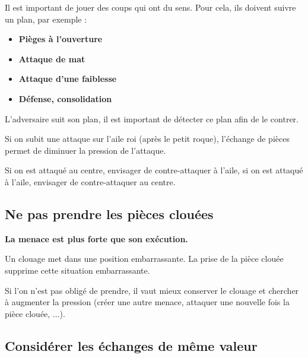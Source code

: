 Il est important de jouer des coups qui ont du sens. Pour cela, ils doivent suivre un plan, par exemple : 

\begin{itemize}[leftmargin=2.7cm, label=, itemsep=0pt]%
\item  {\bf Pièges à l'ouverture}
\item  {\bf Attaque de mat}
\item  {\bf Attaque d'une faiblesse}
\item  {\bf Défense, consolidation}
\end{itemize}

L'adversaire suit son plan, il est important de détecter ce plan afin de le contrer.

{\footnotesize %

Si on subit une attaque sur l'aile roi (après le petit roque), l'échange de pièces permet de diminuer la pression de l'attaque.

Si on est attaqué au centre, envisager de contre-attaquer à l'aile, si on est attaqué à l'aile, envisager de contre-attaquer au centre.


}

\subsection{Ne pas prendre les pièces clouées}

{\bf La menace est plus forte que son exécution.}

Un clouage met dans une position embarrassante. La prise de la pièce clouée supprime cette situation embarrassante.

Si l'on n'est pas obligé de prendre, il vaut mieux conserver le clouage et chercher à augmenter la pression (créer une autre menace, attaquer une nouvelle fois la pièce clouée, ...).


%
%
\subsection{Considérer les échanges de même valeur}

